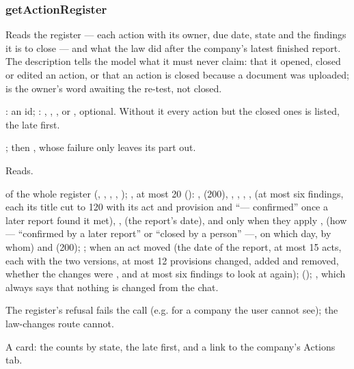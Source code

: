\subsubsection{getActionRegister}\label{sec:tools:getActionRegister}
\begin{description}[style=multiline, leftmargin=19mm, labelwidth=17mm, labelsep=2mm,
  font=\sffamily\bfseries\footnotesize\color{ink}, itemsep=1pt, topsep=2pt, before=\raggedright]
  \item[Does] Reads the register --- each action with its owner, due date, state and the
    findings it is to close --- and what the law did after the company's latest finished
    report. The description tells the model what it must never claim: that it opened, closed
    or edited an action, or that an action is closed because a document was uploaded;
     is the owner's word awaiting the re-test, not closed.
  \item[Input] : an id; : , ,
    ,  or , optional. Without it every action but
    the closed ones is listed, the late first.
  \item[Calls] ; then
    , whose failure only leaves its part out.
  \item[Kind] Reads.
  \item[Returns]  of the whole register (, ,
    , , ); , at most 20
    (): ,  (200), , ,
    , ,  (at most six findings, each its title cut to 120
    with its act and provision and \enquote{--- confirmed} once a later report found it met),
    ,  (the report's date), and only when they apply
    ,  (how --- \enquote{confirmed by a later report} or
    \enquote{closed by a person} ---, on which day, by whom) and  (200);
    ;  when an act moved (the date of the report, at most 15
    acts, each with the two versions, at most 12 provisions changed, added and removed, whether
    the changes were , and at most six findings to look at again); 
    (); , which always says that nothing is changed
    from the chat.
  \item[Errors] The register's refusal fails the call (e.g.  for a company the
    user cannot see); the law-changes route cannot.
  \item[Console] A card: the counts by state, the late first, and a link to the company's
    Actions tab.
\end{description}


